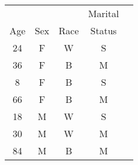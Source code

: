 \begin{tabular}{ccccc}
     &     &      & Marital \\
 Age & Sex & Race & Status \\
 24  & F  & W   & S  \\
 36  & F  & B   & M  \\
 8  & F  & B   & S  \\
 66  & F  & B   & M  \\
 18  & M  & W   & S  \\
 30  & M  & W   & M  \\
 84  & M  & B   & M  \\
\hline
\end{tabular}
